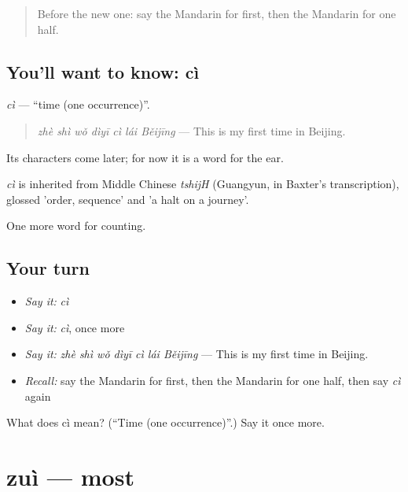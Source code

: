 \begin{quote}
Before the new one: say the Mandarin for first, then the Mandarin for one half.
\end{quote}

\subsection*{You'll want to know: cì}
\emph{cì} — \textquotedblleft{}time (one occurrence)\textquotedblright{}.

\begin{quote}
\emph{zhè shì wǒ dìyī cì lái Běijīng} — This is my first time in Beijing.
\end{quote}

Its characters come later; for now it is a word for the ear.

\begin{cousinweb}
\emph{cì} is inherited from Middle Chinese \emph{tshijH} (Guangyun, in Baxter's transcription), glossed 'order, sequence' and 'a halt on a journey'.
\end{cousinweb}

\begin{grammarlens}[title={What you've built}]
One more word for counting.
\end{grammarlens}

\subsection*{Your turn}
\begin{itemize}
\raggedright
  \item \emph{Say it:} \emph{cì}
  \item \emph{Say it:} \emph{cì}, once more
  \item \emph{Say it:} \emph{zhè shì wǒ dìyī cì lái Běijīng} — This is my first time in Beijing.
  \item \emph{Recall:} say the Mandarin for first, then the Mandarin for one half, then say \emph{cì} again
\end{itemize}

\begin{tcolorbox}[breakable,colback=teal!4,colframe=teal!35!black,title={Before you move on}]
What does cì mean? (\textquotedblleft{}Time (one occurrence)\textquotedblright{}.) Say it once more.
\end{tcolorbox}
\section[zuì]{zuì — most}

